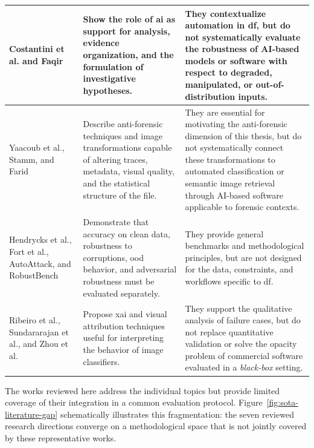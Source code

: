 \begin{table}[htbp]
\begin{tabularx}{\textwidth}{@{}p{3.8cm} X X@{}}
\midrule

Costantini et al. and Faqir~\cite{costantini2019digital,faqir2023digital} &
Show the role of \gls{ai} as support for analysis, evidence organization, and
the formulation of investigative hypotheses. &
They contextualize automation in \gls{df}, but do not systematically evaluate
the robustness of AI-based models or software with respect to degraded,
manipulated, or out-of-distribution inputs. \\

\midrule

Yaacoub et al., Stamm, and Farid~\cite{yaacoub2021digital,stamm2010anti,farid2016photo} &
Describe anti-forensic techniques and image transformations capable of altering
traces, metadata, visual quality, and the statistical structure of the file. &
They are essential for motivating the anti-forensic dimension of this thesis,
but do not systematically connect these transformations to automated
classification or semantic image retrieval through AI-based software applicable
to forensic contexts. \\

\midrule

Hendrycks et al., Fort et al., AutoAttack, and RobustBench~\cite{hendrycks2019benchmarking,hendrycks2017baseline,fort2021exploring,croce2020autoattack,croce2020robustbench} &
Demonstrate that accuracy on clean data, robustness to corruptions, \gls{ood}
behavior, and adversarial robustness must be evaluated separately. &
They provide general benchmarks and methodological principles, but are not
designed for the data, constraints, and workflows specific to \gls{df}. \\

\midrule

Ribeiro et al., Sundararajan et al., and Zhou et al.~\cite{Ribeiro2016,Sundararajan2017,Zhou2016} &
Propose \gls{xai} and visual attribution techniques useful for interpreting the
behavior of image classifiers. &
They support the qualitative analysis of failure cases, but do not replace
quantitative validation or solve the opacity problem of commercial software
evaluated in a \textit{black-box} setting. \\

\bottomrule
\end{tabularx}
\end{table}

The works reviewed here address the individual topics but provide limited
coverage of their integration in a common evaluation protocol.
Figure~\ref{fig:sota-literature-gap} schematically illustrates this
fragmentation: the seven reviewed research directions converge on a
methodological space that is not jointly covered by these representative
works.

